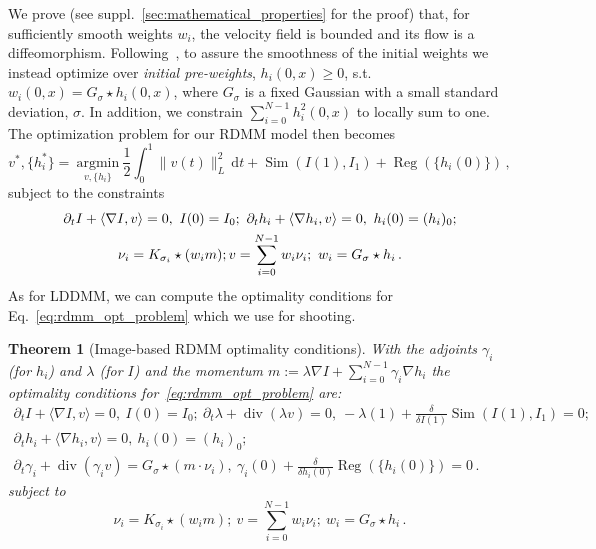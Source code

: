 \documentclass{article}
\numberwithin{equation}{section}
\newtheorem{theorem}{Theorem}
\let\on=\operatorname
\newcommand{\ud}{\,\mathrm{d}}
\begin{document}
We prove (see suppl.~\ref{sec:mathematical_properties} for the proof) that, for sufficiently smooth weights $w_i$, the velocity field is bounded and its flow is a diffeomorphism. Following~\citep{niethammer2019_cvpr}, to assure the smoothness of the initial weights we instead optimize over \emph{initial pre-weights}, $h_{i}(0,x)\geq 0$, s.t. $w_{i}(0,x)=G_\sigma \star h_{i}(0,x)$, where $G_\sigma$ is a fixed Gaussian with a small standard deviation, $\sigma$. In addition, we constrain $\sum_{i=0}^{N-1} h_i^2(0,x)$ to locally sum to one. The optimization problem for our RDMM model then becomes
\begin{equation}
v^*,\{h_i^*\} =~\underset{v,\{h_i\}}{\text{argmin}}~ \frac 12 \int_0^1 \|v(t) \|^2_L \ud t + \on{Sim}(I(1),I_1) + \on{Reg}(\{h_i(0)\})\, ,
\label{eq:rdmm_opt_problem}
\end{equation}
subject to the constraints
\begin{gather}
\partial_t I + \langle \nabla I , v \rangle = 0,~I(0)=I_0;~
\partial_t h_i + \langle \nabla h_i , v \rangle = 0,~h_i(0)=(h_i)_0;\\ \notag
\nu_i = K_{\sigma_i} \star (w_i m); v = \sum_{i =0}^{N-1} w_i \nu_i;~
w_i = G_\sigma\star h_i\,.\label{eq:rdmm_image_constraints}
\end{gather}
As for LDDMM, we can compute the optimality conditions for Eq.~\eqref{eq:rdmm_opt_problem} which we use for shooting.

\begin{theorem}[Image-based RDMM optimality conditions] \label{thm:rdmm_image_optimality}
With the adjoints $\gamma_i$ (for $h_i$) and $\lambda$ (for $I$) and the momentum $m:= \lambda\nabla I +\sum_{i=0}^{N-1} \gamma_i \nabla h_i $ the optimality conditions for~\eqref{eq:rdmm_opt_problem} are: 
\begin{gather}
\partial_t I + \langle \nabla I , v \rangle = 0,~I(0)=I_0;~\partial_t \lambda + \on{div}(\lambda v) = 0,~-\lambda(1) +  \frac{\delta}{\delta I(1)}\on{Sim}(I(1),I_1) = 0;\\
\partial_t h_i + \langle \nabla h_i , v \rangle = 0,~h_i(0)=(h_i)_0;\\
\partial_t \gamma_i + \on{div}(\gamma_i v) = G_\sigma \star (m \cdot \nu_i),~\gamma_i(0) +\frac{\delta}{\delta h_i(0)}\on{Reg}(\{h_i(0)\}) = 0\,.
\end{gather}
subject to  
\begin{equation}
\nu_i = K_{\sigma_i} \star (w_i m);~v = \sum_{i =0}^{N-1} w_i \nu_i;~w_i=G_{\sigma}\star h_i\,.
\label{eq:vel_momentum_relationship}
\end{equation}

\end{theorem}
\end{document}
